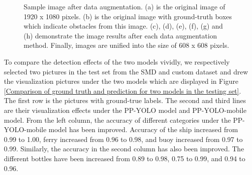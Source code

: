 \documentclass[sensors,article,submit,moreauthors,pdftex]{Definitions/mdpi}
\begin{document}
\begin{paracol}{2}
\begin{figure}[H]
{}
\quad
{}
\quad
{}
\quad
{}
\caption{Sample image after data augmentation. (a) is the original image of 1920 x 1080 pixels. (b) is the original image with ground-truth boxes which indicate obstacles from this image. (c), (d), (e), (f), (g) and (h) demonstrate the image results after each data augmentation method. Finally, images are unified into the size of 608 x 608 pixels.
}
\label{fig:data agumentation}
\end{figure}


To compare the detection effects of the two models vividly, we respectively selected two pictures in the test set from the SMD and custom dataset and drew the visualization pictures under the two models which are displayed in Figure \ref{Comparison of ground truth and prediction for two models in the testing set}. The first row is the pictures with ground-true labels. The second and third lines are their visualization effects under the PP-YOLO model and PP-YOLO-mobile model. 
From the left column, the accuracy of different categories under the PP-YOLO-mobile model has been improved. Accuracy of the ship increased from 0.99 to 1.00, ferry increased from 0.96 to 0.98, and buoy increased from 0.97 to 0.99.
Similarly, the accuracy in the second column has also been improved. The different bottles have been increased from 0.89 to 0.98, 0.75 to 0.99, and 0.94 to 0.96.


\end{paracol}
\end{document}
